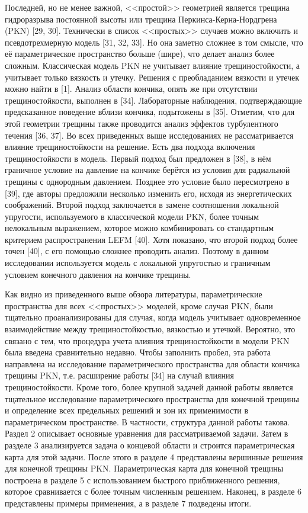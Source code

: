 \documentclass[a4paper, 12pt]{article}
\begin{document}
Последней, но не менее важной, <<простой>> геометрией является трещина гидроразрыва постоянной высоты или трещина Перкинса-Керна-Нордгрена (PKN) [29, 30].
Технически в список <<простых>> случаев можно включить и псевдотрехмерную модель [31, 32, 33].
Но она заметно сложнее в том смысле, что её параметрическое пространство больше (шире), что делает анализ более сложным.
Классическая модель PKN не учитывает влияние трещиностойкости, а учитывает только вязкость и утечку.
Решения с преобладанием вязкости и утечек можно найти в [1].
Анализ области кончика, опять же при отсутствии трещиностойкости, выполнен в [34].
Лабораторные наблюдения, подтверждающие предсказанное поведение вблизи кончика, подытожены в [35].
Отметим, что для этой геометрии трещины также проводится анализ эффектов турбулентного течения [36, 37].
Во всех приведенных выше исследованиях не рассматривается влияние трещиностойкости на решение.
Есть два подхода включения трещиностойкости в модель.
Первый подход был предложен в [38], в нём граничное условие на давление на кончике берётся из условия для радиальной трещины с однородным давлением.
Позднее это условие было пересмотрено в [39], где авторы предложили несколько изменить его, исходя из энергетических соображений.
Второй подход заключается в замене соотношения локальной упругости, используемого в классической модели PKN, более точным нелокальным выражением, которое можно комбинировать со стандартным критерием распространения LEFM [40].
Хотя показано, что второй подход более точен [40], с его помощью сложнее проводить анализ.
Поэтому в данном исследовании используется модель с локальной упругостью и граничным условием конечного давления на кончике трещины.

Как видно из приведенного выше обзора литературы, параметрические пространства для всех <<простых>> моделей, кроме случая PKN, были тщательно проанализированы для случая, когда модель учитывает одновременное взаимодействие между трещиностойкостью, вязкостью и утечкой.
Вероятно, это связано с тем, что процедура учета влияния трещиностойкости в модели PKN была введена сравнительно недавно.
Чтобы заполнить пробел, эта работа направлена на исследование параметрического пространства для области кончика трещины PKN, т.е. расширение работы [34] на случай влияния трещиностойкости.
Кроме того, более крупной задачей данной работы является тщательное исследование параметрического пространства для конечной трещины и определение всех предельных решений и зон их применимости в параметрическом пространстве.
В частности, структура данной работы такова.
Раздел 2 описывает основные уравнения для рассматриваемой задачи.
Затем в разделе 3 анализируется задача о концевой области и строится параметрическая карта для этой задачи.
После этого в разделе 4 представлены вершинные решения для конечной трещины PKN.
Параметрическая карта для конечной трещины построена в разделе 5 с использованием быстрого приближенного решения, которое сравнивается с более точным численным решением.
Наконец, в разделе 6 представлены примеры применения, а в разделе 7 подведены итоги.
\end{document}
